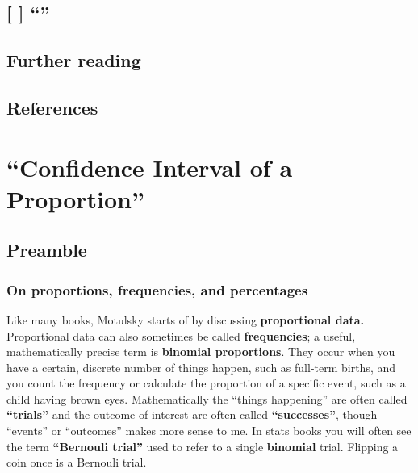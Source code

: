 \documentclass[]{book}
\theoremstyle{definition}
\theoremstyle{definition}
\theoremstyle{definition}
\theoremstyle{remark}
\begin{document}
\section{\texorpdfstring{{[} {]} ``''}{{[} {]} }}\label{section-2}

\section*{Further reading}\label{further-reading-2}

\section*{References}\label{references-2}

\chapter{\texorpdfstring{``Confidence Interval of a
Proportion''}{Confidence Interval of a Proportion}}\label{ch4}

\section*{Preamble}\label{preamble}

\subsection*{On proportions, frequencies, and
percentages}\label{on-proportions-frequencies-and-percentages}

Like many books, Motulsky starts of by discussing \textbf{proportional
data.} Proportional data can also sometimes be called
\textbf{frequencies}; a useful, mathematically precise term is
\textbf{binomial proportions}. They occur when you have a certain,
discrete number of things happen, such as full-term births, and you
count the frequency or calculate the proportion of a specific event,
such as a child having brown eyes. Mathematically the ``things
happening'' are often called \textbf{``trials''} and the outcome of
interest are often called \textbf{``successes''}, though ``events'' or
``outcomes'' makes more sense to me. In stats books you will often see
the term \textbf{``Bernouli trial''} used to refer to a single
\textbf{binomial} trial. Flipping a coin once is a Bernouli trial.
\end{document}
